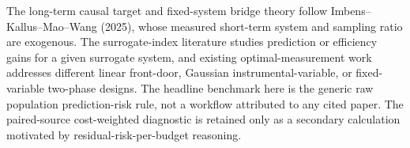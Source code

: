 The long-term causal target and fixed-system bridge theory follow Imbens--Kallus--Mao--Wang (2025), whose measured short-term system and sampling ratio are exogenous. The surrogate-index literature studies prediction or efficiency gains for a given surrogate system, and existing optimal-measurement work addresses different linear front-door, Gaussian instrumental-variable, or fixed-variable two-phase designs. The headline benchmark here is the generic raw population prediction-risk rule, not a workflow attributed to any cited paper. The paired-source cost-weighted diagnostic is retained only as a secondary calculation motivated by residual-risk-per-budget reasoning.